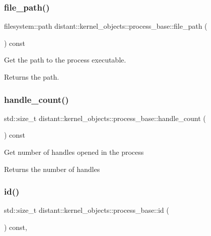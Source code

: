 \subsubsection{\texorpdfstring{file\+\_\+path()}{file\_path()}}
{\footnotesize\ttfamily filesystem\+::path distant\+::kernel\+\_\+objects\+::process\+\_\+base\+::file\+\_\+path (\begin{DoxyParamCaption}{ }\end{DoxyParamCaption}) const\hspace{0.3cm}{\ttfamily [inline]}}



Get the path to the process executable. 

\begin{DoxyReturn}{Returns}
the path. 
\end{DoxyReturn}
\mbox{\label{classdistant_1_1kernel__objects_1_1process__base_a8c14c3aca084496eafa68f23b7535567}} 
\subsubsection{\texorpdfstring{handle\+\_\+count()}{handle\_count()}}
{\footnotesize\ttfamily std\+::size\+\_\+t distant\+::kernel\+\_\+objects\+::process\+\_\+base\+::handle\+\_\+count (\begin{DoxyParamCaption}{ }\end{DoxyParamCaption}) const\hspace{0.3cm}{\ttfamily [inline]}}

Get number of handles opened in the process \begin{DoxyReturn}{Returns}
the number of handles 
\end{DoxyReturn}
\mbox{\label{classdistant_1_1kernel__objects_1_1process__base_a553b90767de864164d807075f67c1402}} 
\subsubsection{\texorpdfstring{id()}{id()}}
{\footnotesize\ttfamily std\+::size\+\_\+t distant\+::kernel\+\_\+objects\+::process\+\_\+base\+::id (\begin{DoxyParamCaption}{ }\end{DoxyParamCaption}) const\hspace{0.3cm}{\ttfamily [inline]}, {\ttfamily [noexcept]}}



